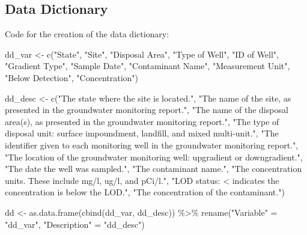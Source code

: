 \documentclass[12pt, twoside]{amherstthesis}
\newenvironment{Shaded}{\begin{snugshade}}{\end{snugshade}}
\newcommand{\FunctionTok}[1]{\textcolor[rgb]{0.00,0.00,0.00}{#1}}
\newcommand{\NormalTok}[1]{#1}
\newcommand{\OtherTok}[1]{\textcolor[rgb]{0.56,0.35,0.01}{#1}}
\newcommand{\SpecialCharTok}[1]{\textcolor[rgb]{0.00,0.00,0.00}{#1}}
\newcommand{\StringTok}[1]{\textcolor[rgb]{0.31,0.60,0.02}{#1}}
\begin{document}
\hypertarget{data-dictionary}{%
\subsection{Data Dictionary}\label{data-dictionary}}

Code for the creation of the data dictionary:
\begin{Shaded}
\begin{Highlighting}[]
\NormalTok{dd\_var }\OtherTok{\textless{}{-}} \FunctionTok{c}\NormalTok{(}\StringTok{"State"}\NormalTok{, }\StringTok{"Site"}\NormalTok{, }\StringTok{"Disposal Area"}\NormalTok{, }\StringTok{"Type of Well"}\NormalTok{,}
            \StringTok{"ID of Well"}\NormalTok{, }\StringTok{"Gradient Type"}\NormalTok{, }
            \StringTok{"Sample Date"}\NormalTok{, }
            \StringTok{"Contaminant Name"}\NormalTok{, }\StringTok{"Measurement Unit"}\NormalTok{,}
            \StringTok{"Below Detection"}\NormalTok{, }\StringTok{"Concentration"}\NormalTok{)}

\NormalTok{dd\_desc }\OtherTok{\textless{}{-}} \FunctionTok{c}\NormalTok{(}\StringTok{"The state where the site is located."}\NormalTok{,}
             \StringTok{"The name of the site, as presented in the}
\StringTok{             groundwater monitoring report."}\NormalTok{,}
             \StringTok{"The name of the disposal area(s), as presented }
\StringTok{             in the groundwater monitoring report."}\NormalTok{,}
             \StringTok{"The type of disposal unit: surface impoundment, }
\StringTok{             landfill, and mixed multi{-}unit."}\NormalTok{,}
             \StringTok{"The identifier given to each monitoring well in the }
\StringTok{             groundwater monitoring report."}\NormalTok{,}
             \StringTok{"The location of the groundwater monitoring well: }
\StringTok{             upgradient or downgradient."}\NormalTok{,}
             \StringTok{"The date the well was sampled."}\NormalTok{,}
             \StringTok{"The contaminant name."}\NormalTok{,}
             \StringTok{"The concentration units. These include mg/l, ug/l, }
\StringTok{             and pCi/l."}\NormalTok{,}
             \StringTok{"LOD status: \textquotesingle{}\textless{}\textquotesingle{} indicates}
\StringTok{             the concentration is below the LOD."}\NormalTok{,}
             \StringTok{"The concentration of the contaminant."}\NormalTok{)}

\NormalTok{dd }\OtherTok{\textless{}{-}} \FunctionTok{as.data.frame}\NormalTok{(}\FunctionTok{cbind}\NormalTok{(dd\_var, dd\_desc)) }\SpecialCharTok{\%\textgreater{}\%}
  \FunctionTok{rename}\NormalTok{(}\StringTok{"Variable"} \OtherTok{=} \StringTok{"dd\_var"}\NormalTok{,}
         \StringTok{"Description"} \OtherTok{=} \StringTok{"dd\_desc"}\NormalTok{) }


\end{Highlighting}
\end{Shaded}
\end{document}
